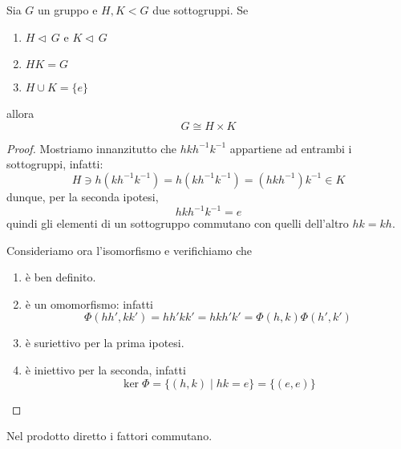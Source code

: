 \begin{multicols}{2}



\begin{theorem}[di Struttura]{\label{struttura}}
	Sia $ G $ un gruppo e $ H, K < G $ due sottogruppi. Se
	\begin{enumerate}
		\item $ H \lhd\, G $   e   $ K \lhd\, G $
		\item $ HK = G $
		\item $ H \cup K = \{e\} $
	\end{enumerate}
allora $$  G \cong H \times K  $$
\end{theorem}
\begin{proof}
	Mostriamo innanzitutto che $ hkh^{-1}k^{-1} $ appartiene ad entrambi i sottogruppi, infatti:
	\[ H  \ni h(kh^{-1}k^{-1}) = h(kh^{-1}k^{-1}) = (hkh^{-1})k^{-1} \in K \]
	dunque, per la seconda ipotesi, $$ hkh^{-1}k^{-1} = e $$ quindi gli elementi di un sottogruppo commutano con quelli dell'altro $ hk = kh $.
	
	Consideriamo ora l'isomorfismo 
	e verifichiamo che
	\begin{enumerate}
		\item è ben definito.
		\item è un omomorfismo: infatti \[ \Phi(hh', kk') = hh'kk' = hkh'k' = \Phi(h, k)\Phi(h',k') \]
		\item è suriettivo per la prima ipotesi.
		\item è iniettivo per la seconda, infatti \[ \ker\Phi = \{ (h, k) \mid hk = e \} = \{ (e, e) \} \]
	\end{enumerate}
\end{proof}

\begin{remark}
	Nel prodotto diretto i fattori commutano.
\end{remark}


\end{multicols}
